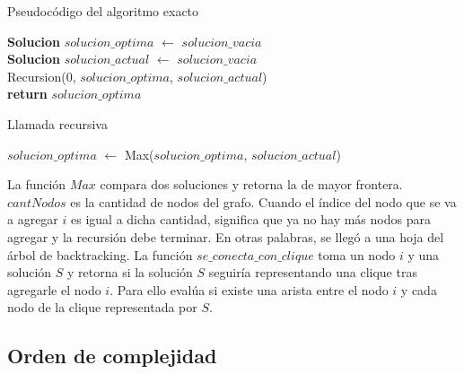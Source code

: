 \begin{algorithm}[H]
	\caption{Pseudocódigo del algoritmo exacto}
	\textbf{Solucion} $solucion\_optima$ $\leftarrow$ $solucion\_vacia$\\
	\textbf{Solucion} $solucion\_actual$ $\leftarrow$ $solucion\_vacia$\\
	Recursion(0, $solucion\_optima$, $solucion\_actual$)\\
	\textbf{return} $solucion\_optima$
\end{algorithm}

\begin{algorithm}[H]
	\caption{Llamada recursiva}
	$solucion\_optima$ $\leftarrow$ Max($solucion\_optima$, $solucion\_actual$)\\

\end{algorithm}

\par{La función $Max$ compara dos soluciones y retorna la de mayor frontera.
$cantNodos$ es la cantidad de nodos del grafo. Cuando el índice del nodo que se
va a agregar $i$ es igual a dicha cantidad, significa que ya no hay más nodos
para agregar y la recursión debe terminar. En otras palabras, se llegó a una
hoja del árbol de backtracking. La función $se\_conecta\_con\_clique$ toma un
nodo $i$ y una solución $S$ y retorna si la solución $S$ seguiría representando
una clique tras agregarle el nodo $i$. Para ello evalúa si existe una arista
entre el nodo $i$ y cada nodo de la clique representada por $S$.}

\subsection{Orden de complejidad}

